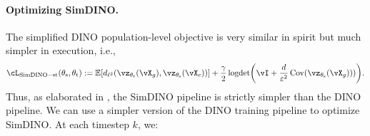 \documentclass[../../book-main.tex]{subfiles}
\begin{document}
\paragraph{Optimizing SimDINO.} The simplified DINO population-level objective is very similar in spirit but much simpler in execution, i.e.,
\begin{equation}\label{eq:simdino_loss_teacherstudent}
    \cL_{\simdino-\student\teacher}(\theta_{\student}, \theta_{\teacher}) :=  \Ex\rs{d_{\ell^{2}}(\vz_{\theta_{\teacher}}(\vX_{g}), \vz_{\theta_{\student}}(\vX_{c}))} + \frac{\gamma}{2}\logdet\rp{\vI + \frac{d}{\eps^{2}}\Cov(\vz_{\theta_{\student}}(\vX_{g})))}.
\end{equation}
Thus, as elaborated in , the SimDINO pipeline is strictly simpler than the DINO pipeline. We can use a simpler version of the DINO training pipeline to optimize SimDINO. At each timestep \(k\), we:
\end{document}
